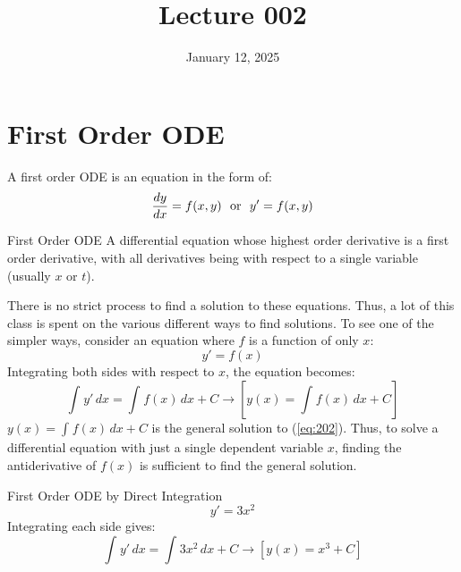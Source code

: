 \documentclass[12pt]{article}
\title{Lecture 002}
\date{January 12, 2025}
\begin{document}
\setcounter{equation}{0}
\newpage

\section{First Order ODE}
\label{sec:firstOrderODE}

A first order ODE is an equation in the form of:
\begin{equation}
  \frac{dy}{dx} = f(x,y) \ \ \textup{or} \ \ y' = f(x,y)
  \label{eq:202}
  \vspace{-10pt}
\end{equation}

\begin{definition}{First Order ODE}
  A differential equation whose highest order derivative is a first order derivative, with all derivatives being with respect to a single variable (usually $x$ or $t$).
\end{definition}

There is no strict process to find a solution to these equations. Thus, a lot of this class is spent on the various different ways to find solutions. To see one of the simpler ways, consider an equation where $f$ is a function of only $x$:
\vspace{-10pt}
\begin{equation*}
  y' = f(x)
\end{equation*}
Integrating both sides with respect to $x$, the equation becomes:
\begin{equation*}
  \int_{}^{} y' \, dx = \int_{}^{} f(x) \, dx + C \rightarrow \left[y(x) = \int_{}^{} f(x) \, dx + C\right]
\end{equation*}
$y(x) = \int_{}^{} f(x) \, dx + C$ is the general solution to (\ref{eq:202}). Thus, to solve a differential equation with just a single dependent variable $x$, finding the antiderivative of $f(x)$ is sufficient to find the general solution.
\begin{example}{First Order ODE by Direct Integration}
  \begin{equation*}
    y' = 3x^2
  \end{equation*}
  Integrating each side gives:
  \begin{equation*}
    \int_{}^{} y' \, dx = \int_{}^{} 3x^2 \, dx + C \rightarrow \left[y(x) = x^3 + C\right]
  \end{equation*}
\end{example}
\end{document}
